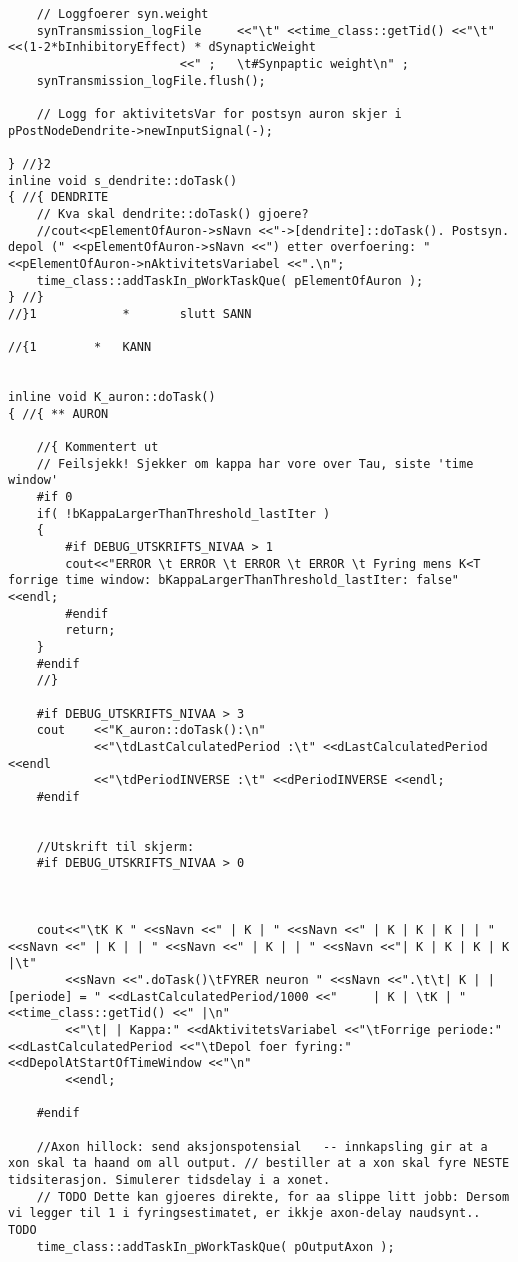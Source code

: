 \begin{lstlisting}
	// Loggfoerer syn.weight
	synTransmission_logFile 	<<"\t" <<time_class::getTid() <<"\t" <<(1-2*bInhibitoryEffect) * dSynapticWeight
						<<" ;   \t#Synpaptic weight\n" ;
	synTransmission_logFile.flush();

	// Logg for aktivitetsVar for postsyn auron skjer i pPostNodeDendrite->newInputSignal(-);

} //}2
inline void s_dendrite::doTask()
{ //{ DENDRITE
	// Kva skal dendrite::doTask() gjoere? 
	//cout<<pElementOfAuron->sNavn <<"->[dendrite]::doTask(). Postsyn. depol (" <<pElementOfAuron->sNavn <<") etter overfoering: " <<pElementOfAuron->nAktivitetsVariabel <<".\n";
	time_class::addTaskIn_pWorkTaskQue( pElementOfAuron );
} //}
//}1            *       slutt SANN

//{1 		* 	KANN


inline void K_auron::doTask()
{ //{ ** AURON

	//{ Kommentert ut
	// Feilsjekk! Sjekker om kappa har vore over Tau, siste 'time window'
	#if 0
	if( !bKappaLargerThanThreshold_lastIter )
	{
		#if DEBUG_UTSKRIFTS_NIVAA > 1
		cout<<"ERROR \t ERROR \t ERROR \t ERROR \t Fyring mens K<T forrige time window: bKappaLargerThanThreshold_lastIter: false" <<endl;
		#endif
		return;
	}
	#endif
	//}

	#if DEBUG_UTSKRIFTS_NIVAA > 3
	cout 	<<"K_auron::doTask():\n"
			<<"\tdLastCalculatedPeriod :\t" <<dLastCalculatedPeriod <<endl
			<<"\tdPeriodINVERSE :\t" <<dPeriodINVERSE <<endl;
	#endif


	//Utskrift til skjerm:
	#if DEBUG_UTSKRIFTS_NIVAA > 0



	cout<<"\tK K " <<sNavn <<" | K | " <<sNavn <<" | K | K | K | | " <<sNavn <<" | K | | " <<sNavn <<" | K | | " <<sNavn <<"| K | K | K | K |\t"
		<<sNavn <<".doTask()\tFYRER neuron " <<sNavn <<".\t\t| K | |  [periode] = " <<dLastCalculatedPeriod/1000 <<"     | K | \tK | " <<time_class::getTid() <<" |\n"
		<<"\t| | Kappa:" <<dAktivitetsVariabel <<"\tForrige periode:" <<dLastCalculatedPeriod <<"\tDepol foer fyring:" <<dDepolAtStartOfTimeWindow <<"\n"
		<<endl;

	#endif

	//Axon hillock: send aksjonspotensial 	-- innkapsling gir at a xon skal ta haand om all output. // bestiller at a xon skal fyre NESTE tidsiterasjon. Simulerer tidsdelay i a xonet.
	// TODO Dette kan gjoeres direkte, for aa slippe litt jobb: Dersom vi legger til 1 i fyringsestimatet, er ikkje axon-delay naudsynt.. TODO
	time_class::addTaskIn_pWorkTaskQue( pOutputAxon );


\end{lstlisting}
